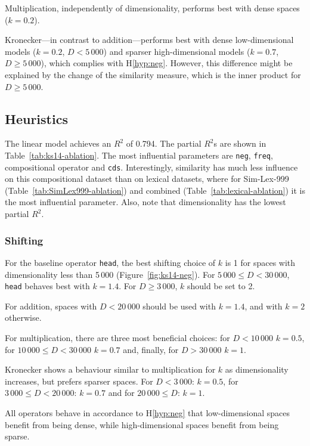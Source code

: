 Multiplication, independently of dimensionality, performs best with dense spaces ($k = 0.2$).

Kronecker---in contrast to addition---performs best with dense low-dimensional models ($k = 0.2$, $D < 5\,000$) and sparser high-dimensional models ($k = 0.7$, $D \geq 5\,000$), which complies with H\ref{hyp:neg}. However, this difference might be explained by the change of the similarity measure, which is the inner product for $D \geq 5\,000$.

\subsection{Heuristics}
\label{sec:heuristics}



The linear model achieves an $R^2$ of 0.794. The partial $R^2$s are shown in Table~\ref{tab:ks14-ablation}. The most influential parameters are \texttt{neg}, \texttt{freq}, compositional operator and \texttt{cds}. Interestingly, similarity has much less influence on this compositional dataset than on lexical datasets, where for Sim-Lex-999 (Table~\ref{tab:SimLex999-ablation}) and combined (Table~\ref{tab:lexical-ablation}) it is the most influential parameter. Also, note that dimensionality has the lowest partial $R^2$.

\subsubsection{Shifting}

For the baseline operator \texttt{head}, the best shifting choice of $k$ is 1 for spaces with dimensionality less than 5\,000 (Figure~\ref{fig:ks14-neg}). For $5\,000 \leq D < 30\,000$, \texttt{head} behaves best with $k = 1.4$. For $D \geq 3\,000$, $k$ should be set to 2.

For addition, spaces with $D < 20\,000$ should be used with $k = 1.4$, and with $k = 2$ otherwise.

For multiplication, there are three most beneficial choices: for $D < 10\,000$ $k = 0.5$, for $10\,000 \leq D < 30\,000$ $k = 0.7$ and, finally, for $D > 30\,000$ $k = 1$.

Kronecker shows a behaviour  similar to multiplication for $k$ as dimensionality increases, but prefers sparser spaces. For $D < 3\,000$: $k = 0.5$, for $3\,000 \leq D < 20\,000$: $k = 0.7$ and for $20\,000 \leq D$: $k = 1$.

All operators behave in accordance to H\ref{hyp:neg} that low-dimensional spaces benefit from being dense, while high-dimensional spaces benefit from being sparse.

